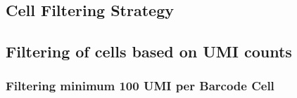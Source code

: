 \documentclass[
  11pt,
  a4paper,
]{report}
\begin{document}
\subsection{Cell Filtering Strategy}\label{cell-filtering-strategy}

\subsection{Filtering of cells based on UMI
counts}\label{filtering-of-cells-based-on-umi-counts}

\subsubsection{Filtering minimum 100 UMI per Barcode
Cell}\label{filtering-minimum-100-umi-per-barcode-cell}
\end{document}
